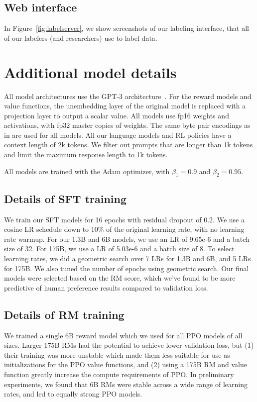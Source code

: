 \subsection{Web interface}
In Figure~\ref{fig:labelserver}, we show screenshots of our labeling interface, that all of our labelers (and researchers) use to label data. 


\newpage
\section{Additional model details}
\label{apdx:model-details}

All model architectures use the GPT-3 architecture~\citep{brown2020language}. For the reward models and value functions, the unembedding layer of the original model is replaced with a projection layer to output a scalar value. All models use fp16 weights and activations, with fp32 master copies of weights. The same byte pair encodings as in \citet{brown2020language} are used for all models. All our language models and RL policies have a context length of 2k tokens. We filter out prompts that are longer than 1k tokens and limit the maximum response length to 1k tokens.

All models are trained with the Adam optimizer, with $\beta_1=0.9$ and $\beta_2=0.95$.


\subsection{Details of SFT training}
We train our SFT models for 16 epochs with residual dropout of 0.2. We use a cosine LR schedule down to 10\% of the original learning rate, with no learning rate warmup. For our 1.3B and 6B models, we use an LR of 9.65e-6 and a batch size of 32. For 175B, we use a LR of 5.03e-6 and a batch size of 8. To select learning rates, we did a geometric search over 7 LRs for 1.3B and 6B, and 5 LRs for 175B. We also tuned the number of epochs using geometric search. Our final models were selected based on the RM score, which we've found to be more predictive of human preference results compared to validation loss.




\subsection{Details of RM training}
\label{apdx:rm-training}

We trained a single 6B reward model which we used for all PPO models of all sizes. Larger 175B RMs had the potential to achieve lower validation loss, but (1) their training was more unstable which made them less suitable for use as initializations for the PPO value functions, and (2) using a 175B RM and value function greatly increase the compute requirements of PPO. In preliminary experiments, we found that 6B RMs were stable across a wide range of learning rates, and led to equally strong PPO models.

